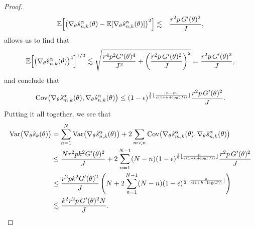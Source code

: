 \begin{proof}
\begin{eqnarray}
\mathbb{E}\Big[\big(\nabla_\theta\hat s_{n,k}^\alpha(\theta)-\mathbb{E}[\nabla_\theta\hat s_{n,k}^\alpha(\theta)]\big)^2\Big] &\lesssim& \frac{r^2p \, G'(\theta)^2}{J},
\end{eqnarray}
allows us to find that 
\begin{equation}
\mathbb{E}\Big[\big(\nabla_\theta\hat s_{n,k}^\alpha(\theta)\big)^4\Big]^{1/2} \lesssim  \sqrt{\frac{r^4p^2G'(\theta)^4}{J^2}+\left(\frac{r^2p \, G'(\theta)^2}{J}\right)^2} = \frac{r^2p \, G'(\theta)^2}{J},
\end{equation}
and conclude that 
\begin{equation}\mathrm{Cov}\big(\nabla_\theta\hat s_{m,k}^\alpha(\theta), \nabla_\theta\hat s_{n,k}^\alpha(\theta)\big) \leq (1-\epsilon)^{\frac{1}{2}\lfloor \frac{|n-m|}{c(1+k+\log(J))} \rfloor}\frac{r^2p \, G'(\theta)^2}{J}.\end{equation}
Putting it all together, we see that
\begin{align}
    \mathrm{Var}\big(\nabla_\theta \hat s_{k}(\theta)\big) &= \sum_{n=1}^N \mathrm{Var}\big(\nabla_\theta\hat s_{n,k}^\alpha(\theta)\big) + 2\sum_{m<n} \mathrm{Cov}\big(\nabla_\theta\hat s_{m,k}^\alpha(\theta),\nabla_\theta\hat s_{n,k}^\alpha(\theta)\big)
    \\
    &\leq \frac{Nr^2pk^2G'(\theta)^2}{J} + 2\sum_{n=1}^{N-1} (N-n)(1-\epsilon)^{\frac{1}{2}\lfloor \frac{n}{c(1+k+\log(J))} \rfloor}\frac{r^2p \, G'(\theta)^2}{J} 
    \\
    &\leq \frac{r^2pk^2G'(\theta)^2}{J} \left(N + 2\sum_{n=1}^{N-1} (N-n) (1-\epsilon)^{\frac{1}{2}\lfloor \frac{n}{c(1+k+\log(J))} \rfloor}\right) 
    \\
    &\lesssim \frac{k^2r^2p \, G'(\theta)^2N}{J}.
\end{align}


\end{proof}
